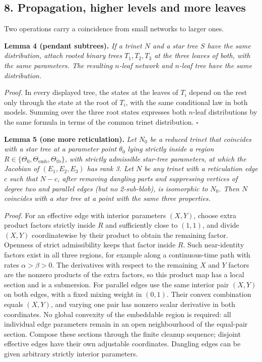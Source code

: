 \documentclass[
  11pt,
]{article}
\begin{document}
\subsection{8. Propagation, higher levels and more
leaves}\label{propagation-higher-levels-and-more-leaves}

Two operations carry a coincidence from small networks to larger ones.

\textbf{Lemma 4 (pendant subtrees).} \emph{If a trinet \(N\) and a star
tree \(S\) have the same distribution, attach rooted binary trees
\(T_1, T_2, T_3\) at the three leaves of both, with the same parameters.
The resulting \(n\)-leaf network and \(n\)-leaf tree have the same
distribution.}

\emph{Proof.} In every displayed tree, the states at the leaves of
\(T_i\) depend on the rest only through the state at the root of
\(T_i\), with the same conditional law in both models. Summing over the
three root states expresses both \(n\)-leaf distributions by the same
formula in terms of the common trinet distribution. \(\square\)

\textbf{Lemma 5 (one more reticulation).} \emph{Let \(N_0\) be a reduced
trinet that coincides with a star tree at a parameter point \(\theta_0\)
lying strictly inside a region
\(R \in \{\Theta_0, \Theta_{\mathrm{emb}}, \Theta_{\mathrm{tb}}\}\),
with strictly admissible star-tree parameters, at which the Jacobian of
\((E_1,E_2,E_3)\) has rank 3. Let \(N\) be any trinet with a
reticulation edge \(c\) such that \(N-c\), after removing dangling parts
and suppressing vertices of degree two and parallel edges (but no
2-sub-blob), is isomorphic to \(N_0\). Then \(N\) coincides with a star
tree at a point with the same three properties.}

\emph{Proof.} For an effective edge with interior parameters \((X,Y)\),
choose extra product factors strictly inside \(R\) and sufficiently
close to \((1,1)\), and divide \((X,Y)\) coordinatewise by their product
to obtain the remaining factor. Openness of strict admissibility keeps
that factor inside \(R\). Such near-identity factors exist in all three
regions, for example along a continuous-time path with rates
\(\alpha>\beta>0\). The derivatives with respect to the remaining \(X\)
and \(Y\) factors are the nonzero products of the extra factors, so this
product map has a local section and is a submersion. For parallel edges
use the same interior pair \((X,Y)\) on both edges, with a fixed mixing
weight in \((0,1)\). Their convex combination equals \((X,Y)\), and
varying one pair has nonzero scalar derivative in both coordinates. No
global convexity of the embeddable region is required: all individual
edge parameters remain in an open neighbourhood of the equal-pair
section. Compose these sections through the finite cleanup sequence;
disjoint effective edges have their own adjustable coordinates. Dangling
edges can be given arbitrary strictly interior parameters.
\end{document}
